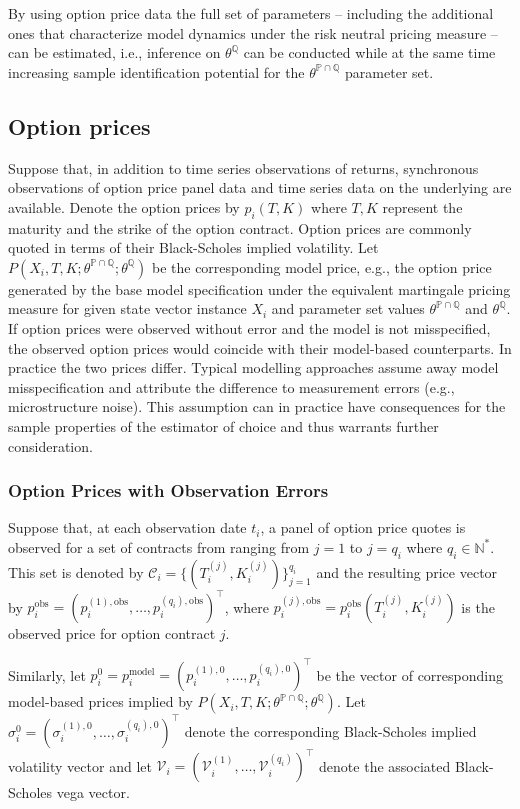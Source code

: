 \documentclass[11pt,a4paper,notitlepage]{article}
\numberwithin{equation}{section}
\begin{document}
By using option price data the full set of parameters -- including the additional ones that characterize model dynamics under the risk neutral pricing measure -- can be estimated, i.e., inference on $\theta^\mathbb{Q}$ can be conducted while at the same time increasing sample identification potential for the $\theta^{\mathbb{P} \cap \mathbb{Q}}$ parameter set. 

\subsection{Option prices}
Suppose that, in addition to time series observations of returns, synchronous observations of option price panel data and time series data on the underlying are available. Denote the option prices by $p_{i}(T,K)$ where $T,K$ represent the maturity and the strike of the option contract. Option prices are commonly quoted in terms of their Black-Scholes implied volatility. Let $P(X_{i},T,K; \theta^{\mathbb{P}\cap\mathbb{Q}}; \theta^\mathbb{Q})$ be the corresponding model price, e.g., the option price generated by the base model specification under the equivalent martingale pricing measure for  given state vector instance $X_{i}$ and parameter set values $\theta^{\mathbb{P}\cap\mathbb{Q}}$ and $\theta^\mathbb{Q}$. If option prices were observed without error and the model is not misspecified, the observed option prices would coincide with their model-based counterparts. In practice the two prices differ. Typical modelling approaches assume away model misspecification and attribute the difference to measurement errors (e.g., microstructure noise).  This assumption can in practice have consequences for the sample properties of the estimator of choice and thus warrants further consideration.

\subsubsection{Option Prices with Observation Errors}
Suppose that, at each observation date $t_i$, a panel of option price quotes is observed for a set of contracts from ranging from $j=1$ to $j=q_i$ where $q_i \in \mathbb{N}^*$. This set is denoted by $\mathcal{C}_i=\{(T_i^{(j)},K_i^{(j)})\}_{j=1}^{q_i}$ and the resulting price vector by
$p_i^{\mathrm{obs}}=\left(p_i^{(1),\mathrm{obs}},\dots,p_i^{(q_i),\mathrm{obs}}\right)^\top$, where $p_i^{(j),\mathrm{obs}}=p_i^{\mathrm{obs}}(T_i^{(j)},K_i^{(j)})$ is the observed price for option contract $j$.


Similarly, let $p_i^{0}=p_i^{\mathrm{model}}=\left(p_i^{(1),0},\dots,p_i^{(q_i),0}\right)^\top$
be the vector of corresponding model-based prices implied by
$P(X_i,T,K;\theta^{\mathbb{P}\cap\mathbb{Q}};\theta^\mathbb{Q})$. Let $\sigma_i^{0} = \left(\sigma_i^{(1),0},\dots,\sigma_i^{(q_i),0}\right)^\top$ denote the corresponding Black-Scholes implied volatility vector and let $ \mathcal{V}_i = \left(\mathcal{V}_i^{(1)},\dots,\mathcal{V}_i^{(q_i)}\right)^\top$ denote the associated Black-Scholes vega vector.
\end{document}
